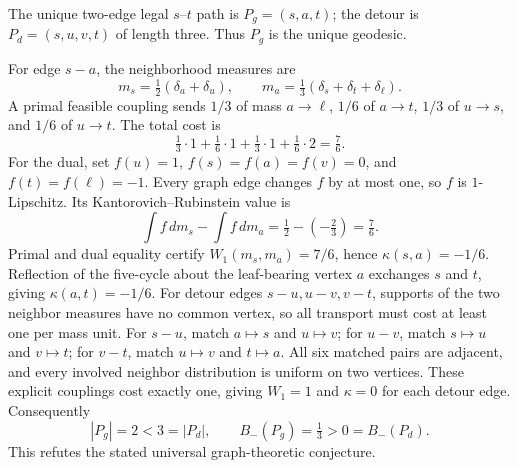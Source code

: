 \begin{center}
\end{center}
The unique two-edge legal $s$--$t$ path is $P_g=(s,a,t)$; the detour is $P_d=(s,u,v,t)$ of length three. Thus $P_g$ is the unique geodesic.

For edge $s-a$, the neighborhood measures are
\[m_s=\tfrac12(\delta_a+\delta_u),\qquad m_a=\tfrac13(\delta_s+\delta_t+\delta_\ell).\]
A primal feasible coupling sends $1/3$ of mass $a\to\ell$, $1/6$ of $a\to t$, $1/3$ of $u\to s$, and $1/6$ of $u\to t$. The total cost is
\[\tfrac13\cdot1+\tfrac16\cdot1+\tfrac13\cdot1+\tfrac16\cdot2=\tfrac76.\]
For the dual, set $f(u)=1$, $f(s)=f(a)=f(v)=0$, and $f(t)=f(\ell)=-1$. Every graph edge changes $f$ by at most one, so $f$ is $1$-Lipschitz. Its Kantorovich--Rubinstein value is
\[\int f\,dm_s-\int f\,dm_a=\tfrac12-(-\tfrac23)=\tfrac76.\]
Primal and dual equality certify $W_1(m_s,m_a)=7/6$, hence $\kappa(s,a)=-1/6$. Reflection of the five-cycle about the leaf-bearing vertex $a$ exchanges $s$ and $t$, giving $\kappa(a,t)=-1/6$. For detour edges $s-u,u-v,v-t$, supports of the two neighbor measures have no common vertex, so all transport must cost at least one per mass unit. For $s-u$, match $a\mapsto s$ and $u\mapsto v$; for $u-v$, match $s\mapsto u$ and $v\mapsto t$; for $v-t$, match $u\mapsto v$ and $t\mapsto a$. All six matched pairs are adjacent, and every involved neighbor distribution is uniform on two vertices. These explicit couplings cost exactly one, giving $W_1=1$ and $\kappa=0$ for each detour edge. Consequently
\[\boxed{|P_g|=2<3=|P_d|,\qquad B_-(P_g)=\tfrac13>0=B_-(P_d).}\]
This refutes the stated universal graph-theoretic conjecture.


